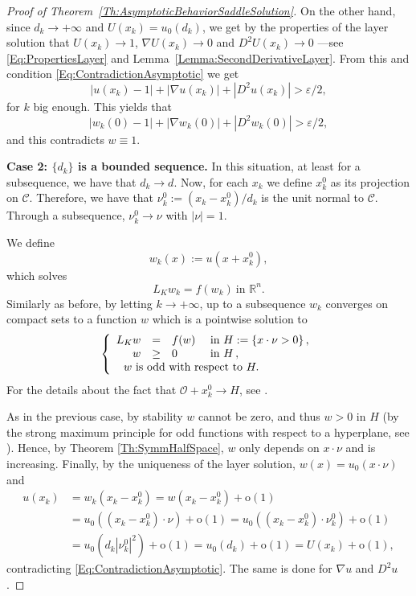 \documentclass[12pt,reqno]{amsart}
\theoremstyle{definition}
\theoremstyle{remark}
\newcommand{\con}[1]{\mathbb{#1}}
\newcommand{\R}{\con{R}} %
\newcommand{\ccal}{\mathscr{C}}
\newcommand{\ocal}{\mathcal{O}}
\newcommand\beqc[1]{\left\{\begin{array}{#1}}
\newcommand\eeqc{\end{array} \right.}
\def\PDEsystem{rcll}
\numberwithin{equation}{section}
\begin{document}
\begin{proof}[Proof of Theorem~\ref{Th:AsymptoticBehaviorSaddleSolution}]
	On the other hand, since $d_k\rightarrow +\infty$ and $U(x_k) =  u_0(d_k)$, we get by the properties of the layer solution that $U(x_k) \rightarrow 1$, $\nabla U(x_k) \rightarrow 0$ and $D^2U(x_k) \rightarrow 0$ ---see \eqref{Eq:PropertiesLayer} and Lemma~\ref{Lemma:SecondDerivativeLayer}. From this and condition \eqref{Eq:ContradictionAsymptotic} we get
	$$
	|u(x_k)-1|+|\nabla u(x_k)|+|D^2u(x_k)| > \varepsilon/2,
	$$
	for $k$ big enough. This yields that 
	$$
	|w_k(0)-1|+|\nabla w_k(0)|+|D^2w_k(0)| > \varepsilon/2,
	$$
	and this contradicts $w \equiv 1$. 
	
	\textbf{Case 2: $\{d_k\}$ is a bounded sequence.}
	In this situation, at least for a subsequence, we have that $d_k \rightarrow d$. Now, for each $x_k$ we define $x_k^0$ as its projection on $\ccal$. Therefore, we have that $ \nu_k^0 := (x_k-x_k^0)/d_k$ is the unit normal to $\ccal$. Through a subsequence, $ \nu_k^0 \rightarrow \nu$ with $|\nu|=1$.
	
	We define
	$$ w_k (x) := u(x+x_k^0), $$
	which solves
	$$ L_K  w_k = f(w_k) \ \text{in } \R^n. $$
	Similarly as before, by letting $k\to +\infty$, up to a subsequence $w_k$ converges on compact sets to a function $w$ which is a pointwise solution to
	$$
	\beqc{\PDEsystem}
	L_K  w &=& f(w)  &\textrm{ in } H:=\{x\cdot \nu >0\}\,,\\
	w &\geq& 0  &\textrm{ in } H\,,\\
	\,\,w \text{ is odd with respect to } H. \span\span\span \,
	\eeqc
	$$
	For the details about the fact that $\ocal+x_k^0 \rightarrow H$, see \cite{CabreTerraI}.
	
	As in the previous case, by stability $w$ cannot be zero, and thus $w>0$ in $H$ (by the strong maximum principle for odd functions with respect to a hyperplane, see \cite{ChenLiLi}). Hence, by Theorem \ref{Th:SymmHalfSpace}, $w$ only depends on $x\cdot \nu$ and is increasing. Finally, by the uniqueness of the layer solution, $w(x) = u_0(x\cdot \nu)$ and
	\begin{align*}
	u(x_k) &= w_k(x_k-x_k^0) = w(x_k-x_k^0) + \mathrm{o}(1) \\
	&= u_0((x_k-x_k^0)\cdot \nu) + \mathrm{o}(1) = u_0((x_k-x_k^0)\cdot \nu_k^0) + \mathrm{o}(1) \\
	&= u_0(d_k |\nu_k^0|^2) + \mathrm{o}(1) = u_0(d_k) + \mathrm{o}(1) = U (x_k) + \mathrm{o}(1),
	\end{align*}
	contradicting \eqref{Eq:ContradictionAsymptotic}. The same is done for $\nabla u$ and $D^2 u$.
\end{proof}
\end{document}
